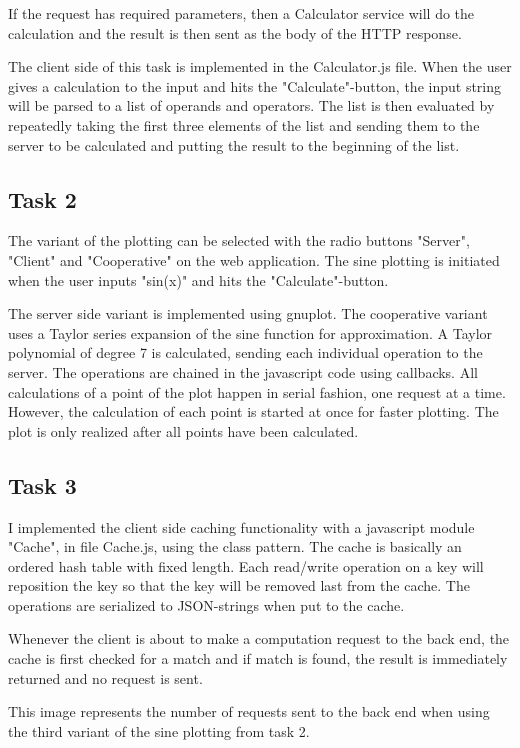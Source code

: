 \documentclass[12pt]{article}
\begin{document}
If the request has required parameters, then a Calculator service will do the calculation and the result is then sent as the body of the HTTP response. 

The client side of this task is implemented in the Calculator.js file. When the user gives a calculation to the input and hits the "Calculate"-button, the input string will be parsed to a list of operands and operators. The list is then evaluated by repeatedly taking the first three elements of the list and sending them to the server to be calculated and putting the result to the beginning of the list.


\subsection*{Task 2}

The variant of the plotting can be selected with the radio buttons "Server", "Client" and "Cooperative" on the web application. The sine plotting is initiated when the user inputs "sin(x)" and hits the "Calculate"-button.

The server side variant is implemented using gnuplot. The cooperative variant uses a Taylor series expansion of the sine function for approximation. A Taylor polynomial of degree 7 is calculated, sending each individual operation to the server. The operations are chained in the javascript code using callbacks. All calculations of a point of the plot happen in serial fashion, one request at a time. However, the calculation of each point is started at once for faster plotting. The plot is only realized after all points have been calculated.

  
\subsection*{Task 3}

I implemented the client side caching functionality with a javascript module "Cache", in file Cache.js, using the class pattern. The cache is basically an ordered hash table with fixed length. Each read/write operation on a key will reposition the key so that the key will be removed last from the cache. The operations are serialized to JSON-strings when put to the cache. 

Whenever the client is about to make a computation request to the back end, the cache is first checked for a match and if match is found, the result is immediately returned and no request is sent.

This image represents the number of requests sent to the back end when using the third variant of the sine plotting from task 2.
\end{document}
